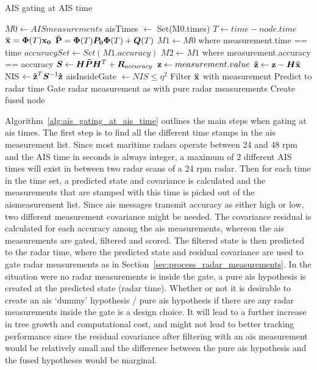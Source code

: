 \begin{algorithm}[H]
\caption{AIS gating at AIS time}\label{alg:ais_gating_at_ais_time}
\begin{algorithmic}[1]
\State{} \(M0 \gets AISmeasurements\)
\State{}  aisTimes \( \gets \) Set(M0.times) 
\State{} \(T \gets time - node.time \)
\State{} \( \boldsymbol{\mathbf{\bar{x}}} = \bm{\Phi}(T) \boldsymbol{\mathbf{x_0}} \)
\State{} \( \boldsymbol{\mathbf{\bar{P}}} = \bm{\Phi}(T) \bm{P_0} \bm{\Phi}(T) + \bm{Q}(T) \)
\State{} \( M1 \gets M0\) where measurement.time  == time
\State{} \( accuracySet \gets Set(M1.accuracy)\) 
\State{} \(M2 \gets M1\) where measurement.accuracy == accuracy
\State{} \( \bm{S} \gets \bm{H}\bm{\bar{P}}\bm{H}^T + \bm{R}_{accuracy} \)
\State{} \( \boldsymbol{\mathbf{z}} \gets measurement.value \)
\State{} \( \boldsymbol{\mathbf{\tilde{z}}} \gets \boldsymbol{\mathbf{z}} - \bm{H} \boldsymbol{\mathbf{\bar{x}}} \)
\State{} NIS \( \gets \boldsymbol{\mathbf{\tilde{z}}}^T \bm{S}^{-1} \boldsymbol{\mathbf{\tilde{z}}} \)
\State{} aisInsideGate \( \gets NIS \leq \eta^2 \)
\State{} Filter \(\boldsymbol{\mathbf{\bar{x}}}\) with measurement
\State{} Predict to radar time
\State{} Gate radar measurement as with pure radar measurements
\State{} Create fused node
\EndFor{}
\EndFor{}
\EndIf{}
\EndFor{}
\EndFor{}
\EndFor{}
\EndProcedure{}
\end{algorithmic}
\end{algorithm}
Algorithm~\ref{alg:ais_gating_at_ais_time} outlines the main steps when gating at \gls{ais} times. The first step is to find all the different time stamps in the \gls{ais} \gls{measurement list}. Since most maritime radars operate between 24 and 48 \gls{rpm} and the AIS time in seconds is always integer, a maximum of 2 different AIS times will exist in between two radar scans of a 24 \gls{rpm} \gls{radar}. Then for each time in the time set, a predicted state and covariance is calculated and the measurements that are stamped with this time is picked out of the \gls{ais}measurement list. Since \gls{ais} messages transmit accuracy as either high or low, two different measurement covariance might be needed. The covariance residual is calculated for each accuracy among the \gls{ais} measurements, whereon the \gls{ais} measurements are gated, filtered and scored. The filtered state is then predicted to the radar time, where the predicted state and residual covariance are used to gate radar measurements as in Section~\ref{sec:process_radar_measurements}. In the situation were no radar measurements is inside the gate, a pure \gls{ais} hypothesis is created at the predicted state (radar time). Whether or not it is desirable to create an \gls{ais} `dummy' hypothesis / pure \gls{ais} hypothesis if there are any radar measurements inside the gate is a design choice. It will lead to a further increase in tree growth and computational cost, and might not lead to better tracking performance since the residual covariance after filtering with an \gls{ais} measurement would be relatively small and the difference between the pure \gls{ais} hypothesis and the fused hypotheses would be marginal.

